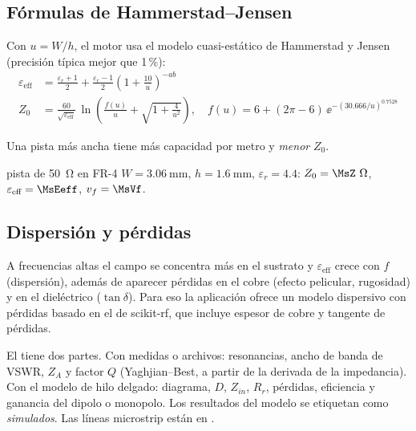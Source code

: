 \subsection{Fórmulas de Hammerstad--Jensen}
Con $u = W/h$, el motor usa el modelo cuasi-estático de Hammerstad y Jensen (precisión típica mejor que 1\,\%):
\begin{align}
  \varepsilon_{\text{eff}} &= \frac{\varepsilon_r + 1}{2} + \frac{\varepsilon_r - 1}{2}\left(1 + \frac{10}{u}\right)^{-ab}\\
  Z_0 &= \frac{60}{\sqrt{\varepsilon_{\text{eff}}}}\,\ln\!\left(\frac{f(u)}{u} + \sqrt{1 + \frac{4}{u^2}}\right),\quad
  f(u) = 6 + (2\pi - 6)\,\ee^{-(30.666/u)^{0.7528}}
\end{align}
\begin{donde}
\end{donde}
Una pista más ancha tiene más capacidad por metro y \emph{menor} $Z_0$.

\begin{ejemplo}{pista de \SI{50}{\ohm} en FR-4}
$W = \SI{3.06}{\milli\metre}$, $h = \SI{1.6}{\milli\metre}$, $\varepsilon_r = 4.4$: $Z_0 = \MsZ~\si{\ohm}$, $\varepsilon_{\text{eff}} = \MsEeff$,
$v_f = \MsVf$.
\end{ejemplo}

\subsection{Dispersión y pérdidas}
A frecuencias altas el campo se concentra más en el sustrato y $\varepsilon_{\text{eff}}$ crece con $f$ (dispersión), además de aparecer pérdidas
en el cobre (efecto pelicular, rugosidad) y en el dieléctrico ($\tan\delta$). Para eso la aplicación ofrece un modelo dispersivo con pérdidas
basado en el de scikit-rf, que incluye espesor de cobre y tangente de pérdidas.

\begin{enlaapp}
El  tiene dos partes. Con medidas o archivos: resonancias, ancho de banda de VSWR, $Z_A$ y factor $Q$ (Yaghjian--Best,
a partir de la derivada de la impedancia). Con el modelo de hilo delgado: diagrama, $D$, $Z_{in}$, $R_r$, pérdidas, eficiencia y ganancia del
dipolo o monopolo. Los resultados del modelo se etiquetan como \emph{simulados}. Las líneas microstrip están en .
\end{enlaapp}
